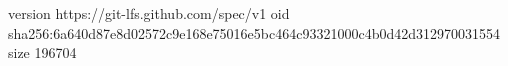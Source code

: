 version https://git-lfs.github.com/spec/v1
oid sha256:6a640d87e8d02572c9e168e75016e5bc464c93321000c4b0d42d312970031554
size 196704
